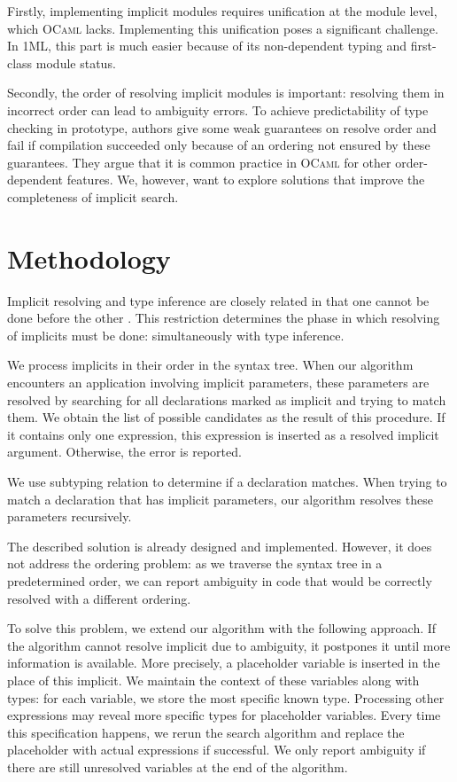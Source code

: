 \documentclass{spbau-diploma}
\begin{document}
Firstly, implementing implicit modules requires unification at the module level, which \textsc{OCaml} lacks. Implementing this unification poses a significant challenge. In \textsc{1ML}, this part is much easier because of its non-dependent typing and first-class module status. 

Secondly, the order of resolving implicit modules is important: resolving them in incorrect order can lead to ambiguity errors. To achieve predictability of type checking in prototype, authors give some weak guarantees on resolve order and fail if compilation succeeded only because of an ordering not ensured by these guarantees. They argue that it is common practice in \textsc{OCaml} for other order-dependent features. We, however, want to explore solutions that improve the completeness of implicit search.

\section{Methodology}

Implicit resolving and type inference are closely related in that one cannot be done before the other \citep{white}. This restriction determines the phase in which resolving of implicits must be done: simultaneously with type inference. 

We process implicits in their order in the syntax tree. When our algorithm encounters an application involving implicit parameters, these parameters are resolved by searching for all declarations marked as implicit and trying to match them. We obtain the list of possible candidates as the result of this procedure. If it contains only one expression, this expression is inserted as a resolved implicit argument. Otherwise, the error is reported.

We use subtyping relation to determine if a declaration matches. When trying to match a declaration that has implicit parameters, our algorithm resolves these parameters recursively.

The described solution is already designed and implemented. However, it does not address the ordering problem: as we traverse the syntax tree in a predetermined order, we can report ambiguity in code that would be correctly resolved with a different ordering. 

To solve this problem, we extend our algorithm with the following approach. If the algorithm cannot resolve implicit due to ambiguity, it postpones it until more information is available. More precisely, a placeholder variable is inserted in the place of this implicit. We maintain the context of these variables along with types: for each variable, we store the most specific known type. Processing other expressions may reveal more specific types for placeholder variables. Every time this specification happens, we rerun the search algorithm and replace the placeholder with actual expressions if successful. We only report ambiguity if there are still unresolved variables at the end of the algorithm.
\end{document}
